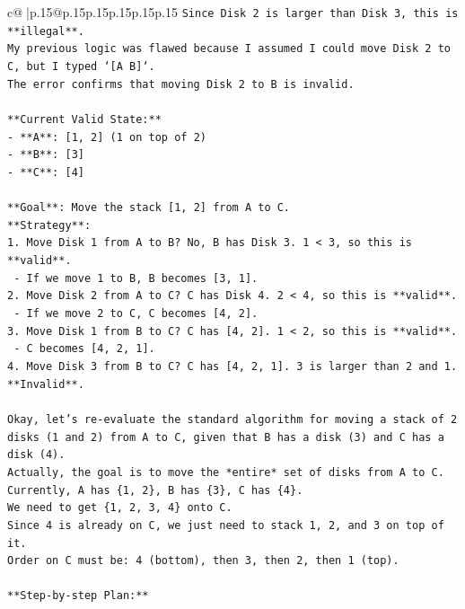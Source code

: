 \documentclass{article}
\begin{document}
{\begin{supertabular}{c@{$\;$}|p{.15\linewidth}@{}p{.15\linewidth}p{.15\linewidth}p{.15\linewidth}p{.15\linewidth}p{.15\linewidth}}
{{{\texttt{Since Disk 2 is larger than Disk 3, this is **illegal**.} \\
\texttt{My previous logic was flawed because I assumed I could move Disk 2 to C, but I typed `{[}A B{]}`.} \\
\texttt{The error confirms that moving Disk 2 to B is invalid.} \\
\\ 
\texttt{**Current Valid State:**} \\
\texttt{{-} **A**: {[}1, 2{]} (1 on top of 2)} \\
\texttt{{-} **B**: {[}3{]}} \\
\texttt{{-} **C**: {[}4{]}} \\
\\ 
\texttt{**Goal**: Move the stack {[}1, 2{]} from A to C.} \\
\texttt{**Strategy**:} \\
\texttt{1. Move Disk 1 from A to B? No, B has Disk 3. 1 < 3, so this is **valid**.} \\
\texttt{   {-} If we move 1 to B, B becomes {[}3, 1{]}.} \\
\texttt{2. Move Disk 2 from A to C? C has Disk 4. 2 < 4, so this is **valid**.} \\
\texttt{   {-} If we move 2 to C, C becomes {[}4, 2{]}.} \\
\texttt{3. Move Disk 1 from B to C? C has {[}4, 2{]}. 1 < 2, so this is **valid**.} \\
\texttt{   {-} C becomes {[}4, 2, 1{]}.} \\
\texttt{4. Move Disk 3 from B to C? C has {[}4, 2, 1{]}. 3 is larger than 2 and 1. **Invalid**.} \\
\\ 
\texttt{Okay, let's re{-}evaluate the standard algorithm for moving a stack of 2 disks (1 and 2) from A to C, given that B has a disk (3) and C has a disk (4).} \\
\texttt{Actually, the goal is to move the *entire* set of disks from A to C.} \\
\texttt{Currently, A has \{1, 2\}, B has \{3\}, C has \{4\}.} \\
\texttt{We need to get \{1, 2, 3, 4\} onto C.} \\
\texttt{Since 4 is already on C, we just need to stack 1, 2, and 3 on top of it.} \\
\texttt{Order on C must be: 4 (bottom), then 3, then 2, then 1 (top).} \\
\\ 
\texttt{**Step{-}by{-}step Plan:**} \\
}}}
\end{supertabular}}
\end{document}
